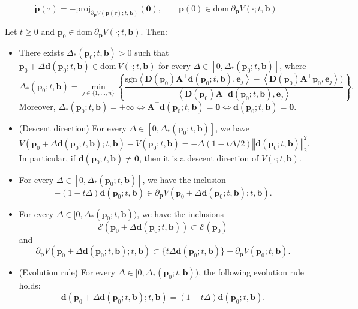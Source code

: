 \documentclass[10pt,a4paper]{amsart}
\def\Atop {\matr{A}^{\top}}
\def\bb {\boldsymbol{b}}
\def\bd {\boldsymbol{d}}
\def\be {\boldsymbol{e}}
\def\bp {\boldsymbol{p}}
\def\bpo {\bp_{0}}
\def\dom {\mathrm{dom~}}    %
\def\epo {\mathcal{E}(\bp_{0})}
\def\proj {\mathrm{proj}}
\def\sign {\mathrm{sgn}}
\newcommand{\matr}[1]{\bm{#1}}
\newcommand{\normsq}[1]{\left\Vert{#1} \right\Vert_{2}^{2}}
\begin{document}
\begin{equation}\label{eq:bp_slow_ode}
    \dot{\bp}(\tau) =-\proj_{\partial_{\bp} V(\bp(\tau);t,\bb)}(\boldsymbol{0}), \qquad \bp(0) \in \dom \partial_{\bp} V(\cdot;t,\bb)
\end{equation}

\begin{prop}\label{prop:descent_direction}
Let $t \geqslant 0$ and $\bpo \in \dom \partial_{\bp} V(\cdot;t,\bb)$. Then:
    \begin{itemize}
    \item[(i)] There exists $\Delta_{*}(\bpo;t,\bb) > 0$ such that $\bpo + \Delta\bd(\bpo;t,\bb) \in \dom V(\cdot;t,\bb)$ for every $\Delta \in [0,\Delta_{*}(\bpo;t,\bb)]$, where
    \begin{equation}\label{eq:descent_max_time}
    \Delta_{*}(\bpo;t,\bb) = \min_{j \in \{1,\dots,n\}} \left\{\frac{\sign{\left\langle \matr{D}(\bpo)\Atop\bd(\bpo;t,\bb),\be_j\right\rangle} - \left\langle \matr{D}(\bpo)\Atop\bpo,\be_j\right\rangle)}{\left\langle\matr{D}(\bpo) \Atop\bd(\bpo;t,\bb),\be_j\right\rangle} \right\}.
    \end{equation}
    Moreover, $\Delta_{*}(\bpo;t,\bb) = +\infty \iff \Atop\bd(\bpo;t,\bb) = \boldsymbol{0} \iff \bd(\bpo;t,\bb) = \boldsymbol{0}$.


    \item[(ii)](Descent direction) For every $\Delta \in [0, \Delta_{*}(\bpo;t,\bb)]$, we have
    \begin{equation}\label{eq:V_formula_descent}
    V(\bpo + \Delta\bd(\bpo;t,\bb);t,\bb) - V(\bpo;t,\bb) = -\Delta\left(1-t\Delta/2\right)\normsq{\bd(\bpo;t,\bb)}.
    \end{equation}
    In particular, if $\bd(\bpo;t,\bb) \neq \boldsymbol{0}$, then it is a descent direction of $V(\cdot;t,\bb)$. 


    \item[(iii)] For every $\Delta \in [0, \Delta_{*}(\bpo;t,\bb)]$, we have the inclusion
    \[
    -(1-t \Delta)\bd(\bpo;t,\bb) \in \partial_{\bp} V(\bpo + \Delta\bd(\bpo;t,\bb);t,\bb).
    \]


    \item[(iv)] For every $\Delta \in [0,\Delta_{*}(\bpo;t,\bb))$, we have the inclusions
    \[
    \mathcal{E}(\bpo + \Delta\bd(\bpo;t,\bb)) \subset \epo
    \]
    and
    \[
    \partial_{\bp}V(\bpo + \Delta\bd(\bpo;t,\bb);t,\bb) \subset \{t\Delta\bd(\bpo;t,\bb)\} + \partial_{\bp}V(\bpo;t,\bb).
    \]


    \item[(v)] (Evolution rule) For every $\Delta \in [0,\Delta_{*}(\bpo;t,\bb))$, the following evolution rule holds:
    \begin{equation}\label{eq:identity_dd}
    \bd(\bpo + \Delta\bd(\bpo;t,\bb);t,\bb) = (1-t \Delta)\bd(\bpo;t,\bb).
    \end{equation}
\end{itemize}
\end{prop}
\end{document}
